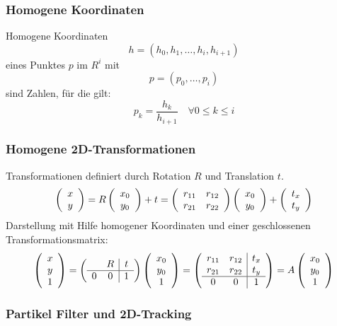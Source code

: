 \subsubsection*{Homogene Koordinaten}

Homogene Koordinaten $$h = (h_0,h_1, \dots, h_i, h_{i+1})$$ eines Punktes $p$ im $R^i$ mit $$p = (p_0,\dots,p_i)$$ sind Zahlen, für die gilt: $$p_k = \frac{h_k}{h_{i+1}} \quad \forall 0 \leq k \leq i$$

\subsubsection*{Homogene 2D-Transformationen}

Transformationen definiert durch Rotation $R$ und Translation $t$.
$$\left( \begin{array}{c} x \\ y \end{array} \right) = R \left( \begin{array}{c} x_0 \\ y_0 \end{array} \right) + t = \left( \begin{array}{cc} r_{11} & r_{12} \\ r_{21} & r_{22} \end{array} \right) \left( \begin{array}{c} x_0 \\ y_0 \end{array} \right) + \left( \begin{array}{c} t_x \\ t_y \end{array} \right)$$
Darstellung mit Hilfe homogener Koordinaten und einer geschlossenen Transformationsmatrix:
$$\left( \begin{array}{c} x \\ y \\ 1 \end{array} \right) = \left( \begin{array}{cc|c} & R & t \\ \hline 0 & 0 & 1 \end{array} \right) \left( \begin{array}{c} x_0 \\ y_0 \\ 1 \end{array} \right) = \left( \begin{array}{cc|c} r_{11} & r_{12} & t_x \\ r_{21} & r_{22} & t_y \\ \hline 0 & 0 & 1 \end{array} \right) = A \left( \begin{array}{c} x_0 \\ y_0 \\ 1 \end{array} \right)$$

\subsubsection*{Partikel Filter und 2D-Tracking}

